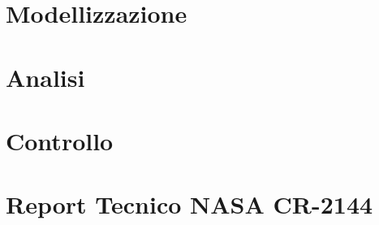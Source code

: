 \documentclass[12pt,a4paper,twoside]{extreport}
\begin{document}
\chapter{Modellizzazione}





\chapter{Analisi}


\chapter{Controllo}



\appendix
\chapter{Report Tecnico NASA CR-2144}\label{appendix:report}


\cleardoublepage

\printbibliography[heading=bibintoc]
\end{document}
